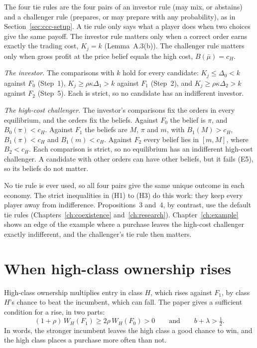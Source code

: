 The four tie rules are the four pairs of an investor rule (may mix, or abstains) and a challenger rule (prepares,
or may prepare with any probability), as in Section~\ref{sec:ccc-setup}. A tie rule only says what a player does
when two choices give the same payoff. The investor rule matters only when
a correct order earns exactly the trading cost, \(K_j=k\) (Lemma~A.3(b)). The challenger rule matters only when gross
profit at the price belief equals the high cost, \(B(\bar\mu)=c_H\).

\begin{derivation}
\emph{The investor.} The comparisons with \(k\) hold for every candidate: \(K_j\le\Delta_0<k\) against \(F_0\)
(Step~1), \(K_j\ge\rho\kappa\Delta_1>k\) against \(F_1\) (Step~2), and \(K_j\ge\rho\kappa\Delta_2>k\) against \(F_2\)
(Step~5). Each is strict, so no candidate has an indifferent investor.

\emph{The high-cost challenger.} The investor's comparisons fix the orders in every equilibrium, and the orders
fix the beliefs. Against \(F_0\) the belief is \(\pi\), and \(B_0(\pi)<c_H\). Against \(F_1\) the beliefs are \(M\),
\(\pi\) and \(m\), with \(B_1(M)>c_H\), \(B_1(\pi)<c_H\) and \(B_1(m)<c_H\). Against \(F_2\) every belief lies in
\([m,M]\), where \(B_2<c_H\). Each comparison is strict, so no equilibrium has an indifferent high-cost challenger.
A candidate with other orders can have other beliefs, but it fails (E5), so its beliefs do not matter.
\end{derivation}

No tie rule is ever used, so all four pairs give the same unique outcome in each economy. The strict inequalities
in (H1) to (H3) do this work: they keep every player away from indifference. Propositions~3 and~4, by contrast,
use the default tie rules (Chapters~\ref{ch:coexistence} and~\ref{ch:research}).
Chapter~\ref{ch:example} shows an edge of the example where a purchase leaves the high-cost challenger exactly
indifferent, and the challenger's tie rule then matters.

\section{When high-class ownership rises}\label{sec:ccc-ownership}

High-class ownership multiplies entry in class \(H\), which rises against \(F_1\), by class \(H\)'s chance to beat
the incumbent, which can fall. The paper gives a sufficient condition for a rise, in two parts:
\begin{equation}\label{eq:ccc-sufficient}
(1+\rho)\,W_H(F_1)\ge2\rho\,W_H(F_0)>0\qquad\text{and}\qquad b+\lambda>\tfrac12 .
\end{equation}
In words, the stronger incumbent leaves the high class a good chance to win, and the high class places a purchase
more often than not.

